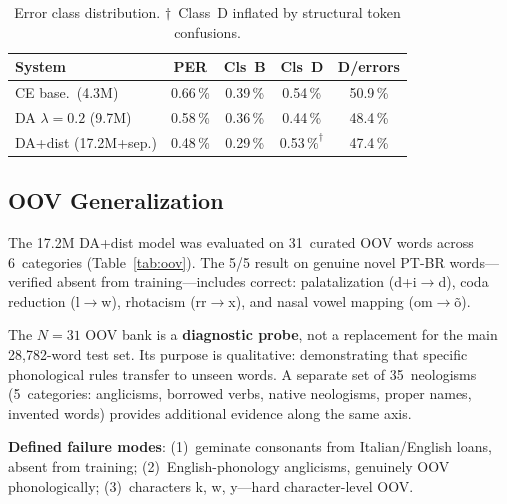 \documentclass[conference]{IEEEtran}
\newcommand{\lam}{\lambda}                %
\begin{document}
\begin{table}[t]
  \caption{Error class distribution. $\dagger$~Class~D inflated by
           structural token confusions.}
  \label{tab:classdist}
  \centering\small
  \begin{tabular}{lcccc}
    \toprule
    System & PER & Cls~B & Cls~D & D/errors \\
    \midrule
    CE base.\ (4.3M)            & 0.66\,\% & 0.39\,\% & 0.54\,\% & 50.9\,\% \\
    DA $\lam\!=\!0.2$ (9.7M)    & 0.58\,\% & 0.36\,\% & 0.44\,\% & 48.4\,\% \\
    DA+dist (17.2M+sep.)        & 0.48\,\% & 0.29\,\% & 0.53\,$\%^\dagger$ & 47.4\,\% \\
    \bottomrule
  \end{tabular}
\end{table}

\subsection{OOV Generalization}
\label{sec:oov}

The 17.2M DA+dist model was evaluated on 31~curated OOV words across
6~categories (Table~\ref{tab:oov}).
The 5/5 result on genuine novel PT-BR words---verified absent from
training---includes correct: palatalization (d+i$\to$d),
coda reduction (l$\to$w), rhotacism (rr$\to$x), and nasal vowel
mapping (om$\to$\~{o}).

The $N\!=\!31$ OOV bank is a \textbf{diagnostic probe}, not a
replacement for the main 28{,}782-word test set.
Its purpose is qualitative: demonstrating that specific phonological
rules transfer to unseen words.
A separate set of 35~neologisms (5~categories: anglicisms,
borrowed verbs, native neologisms, proper names, invented words)
provides additional evidence along the same axis.

\textbf{Defined failure modes}: (1)~geminate consonants from
Italian/English loans, absent from training;
(2)~English-phonology anglicisms, genuinely OOV phonologically;
(3)~characters k, w, y---hard character-level OOV.
\end{document}

